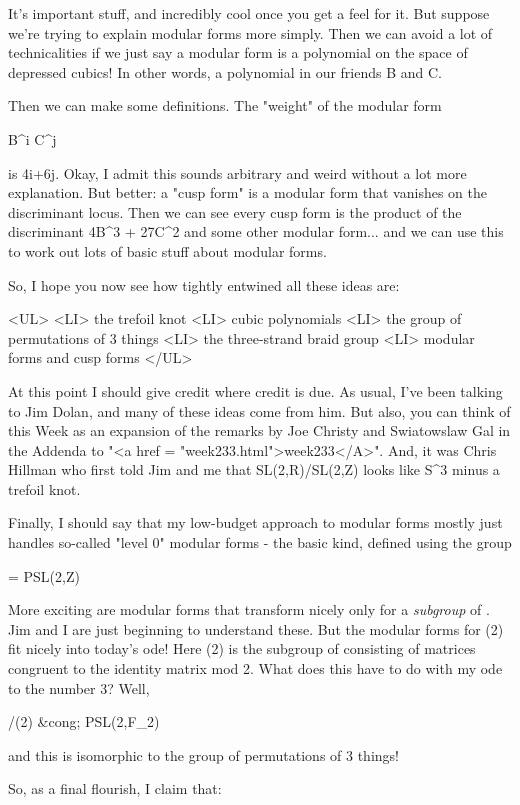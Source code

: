 It's important stuff, and incredibly cool once you get a feel for it.
But suppose we're trying to explain modular forms more simply.
Then we can avoid a lot of technicalities if we just say 
a modular form is a polynomial on the space of depressed cubics!  In 
other words, a polynomial in our friends B and C.  

Then we can make some definitions.  The "weight" of the modular form

B^{i} C^{j}

is 4i+6j.  Okay, I admit this sounds arbitrary and weird without a lot
more explanation.  But better: a "cusp form" is a modular
form that vanishes on the discriminant locus.  Then we can see every
cusp form is the product of the discriminant 4B^{3} +
27C^{2} and some other modular form... and we can use this to
work out lots of basic stuff about modular forms.

So, I hope you now see how tightly entwined all these ideas are:

<UL>
<LI>
  the trefoil knot
<LI>
  cubic polynomials
<LI>
  the group of permutations of 3 things
<LI>
  the three-strand braid group
<LI>
  modular forms and cusp forms
</UL>

At this point I should give credit where credit is due.  As usual,
I've been talking to Jim Dolan, and many of these ideas come from
him.  But also, you can think of this Week as an expansion of the
remarks by Joe Christy and Swiatowslaw Gal in the Addenda to 
"<a href = "week233.html">week233</A>".  And, it was
Chris Hillman who first told Jim and me that SL(2,R)/SL(2,Z) looks
like S^{3} minus a trefoil knot.

Finally, I should say that my low-budget approach to modular forms
mostly just handles so-called "level 0" modular forms - the basic 
kind, defined using the group 

\Gamma  = PSL(2,Z)

More exciting are modular forms that transform nicely only for a 
\emph{subgroup} of \Gamma .   Jim and I are just beginning to understand
these.  But the modular forms for \Gamma (2) fit nicely into today's 
ode!  Here \Gamma (2) is the subgroup of \Gamma  consisting of matrices
congruent to the identity matrix mod 2.  What does this have to do
with my ode to the number 3?  Well,

\Gamma /\Gamma (2) &cong; PSL(2,F_{2}) 

and this is isomorphic to the group of permutations of 3 things! 

So, as a final flourish, I claim that:

